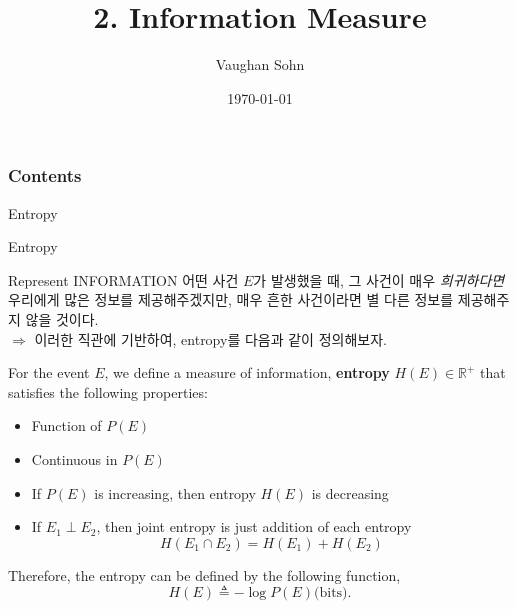 \documentclass[9pt]{beamer}
\title{2. Information Measure}
\date{\today}
\author{Vaughan Sohn}
\begin{document}
    \maketitle
    
    \begin{frame}
        \frametitle{Contents}
        \tableofcontents
    \end{frame}

    \begin{section}{Entropy}
        \begin{frame}{Entropy}
            \begin{block}{Represent INFORMATION}
                어떤 사건 $E$가 발생했을 때, 그 사건이 매우 \textit{희귀하다면} 우리에게 많은 정보를 제공해주겠지만, 매우 흔한 사건이라면 별 다른 정보를 제공해주지 않을 것이다.
                \\ $\Rightarrow$ 이러한 직관에 기반하여, entropy를 다음과 같이 정의해보자.
            \end{block}
            \begin{definition}
                For the event $E$, we define a measure of information, \textbf{entropy} $H(E) \in \mathbb R^+$ that satisfies the following properties:
                \begin{itemize}
                    \item Function of $P(E)$
                    \item Continuous in $P(E)$
                    \item If $P(E)$ is increasing, then entropy $H(E)$ is decreasing
                    \item If $E_1 \perp E_2$, then joint entropy is just addition of each entropy
                    $$ H(E_1 \cap E_2) = H(E_1) + H(E_2)$$
                \end{itemize}
                Therefore, the entropy can be defined by the following function,
                $$H(E) \triangleq -\log P(E) \text{(bits)}.$$
            \end{definition}
        \end{frame}


\end{section}
\end{document}
